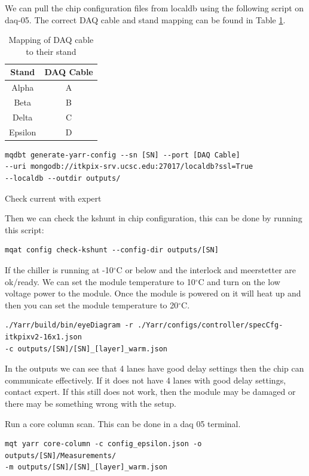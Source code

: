 \documentclass[12pt]{article}
\begin{document}
We can pull the chip configuration files from localdb using the following script on daq-05. The correct DAQ cable and stand mapping can be found in Table \ref{tab:daqmap}.

\begin{table}[H]
    \centering
    \begin{tabular}{c|c}
        \hline 
        Stand & DAQ Cable \\
        \hline
        \hline
        Alpha & A\\
        Beta & B\\
        Delta & C\\
        Epsilon & D\\
        \hline
    \end{tabular}
    \caption{Mapping of DAQ cable to their stand}
    \label{tab:daqmap}
\end{table}

\begin{verbatim}
mqdbt generate-yarr-config --sn [SN] --port [DAQ Cable] 
--uri mongodb://itkpix-srv.ucsc.edu:27017/localdb?ssl=True 
--localdb --outdir outputs/
\end{verbatim}
Check current with expert

Then we can check the kshunt in chip configuration, this can be done by running this script:
\begin{verbatim}
mqat config check-kshunt --config-dir outputs/[SN]
\end{verbatim}

If the chiller is running at -10$^\circ$C or below and the interlock and meerstetter are ok/ready. We can set the module temperature to 10$^\circ$C and turn on the low voltage power to the module. Once the module is powered on it will heat up and then you can set the module temperature to 20$^\circ$C. 
\begin{verbatim}
./Yarr/build/bin/eyeDiagram -r ./Yarr/configs/controller/specCfg-itkpixv2-16x1.json 
-c outputs/[SN]/[SN]_[layer]_warm.json
\end{verbatim}
In the outputs we can see that 4 lanes have good delay settings then the chip can communicate effectively. If it does not have 4 lanes with good delay settings, contact expert. If this still does not work, then the module may be damaged or there may be something wrong with the setup. 

Run a core column scan. This can be done in a daq 05 terminal. 
\begin{verbatim}
mqt yarr core-column -c config_epsilon.json -o outputs/[SN]/Measurements/ 
-m outputs/[SN]/[SN]_[layer]_warm.json 
\end{verbatim}
\end{document}
